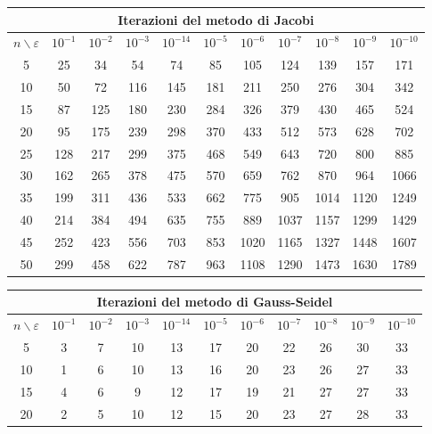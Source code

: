 \begin{sol}
        \footnotesize
        \begin{center}\begin{tabular}{|c||c|c|c|c|c|c|c|c|c|c|}
        \multicolumn{11}{c}{Iterazioni del metodo di Jacobi}\\
        \hline
        $n \backslash \varepsilon $ & $10^{-1}$& $10^{-2}$& $10^{-3}$& $10^{-14}$& $10^{-5}$& $10^{-6}$& $10^{-7}$& $10^{-8}$& $10^{-9}$& $10^{-10}$\\\hline
        5& 25 & 34 & 54 & 74 & 85 & 105 & 124 & 139 & 157 & 171 \\\hline
        10& 50 & 72 & 116 & 145 & 181 & 211 & 250 & 276 & 304 & 342 \\\hline
        15& 87 & 125 & 180 & 230 & 284 & 326 & 379 & 430 & 465 & 524 \\ \hline
        20& 95 & 175 & 239 & 298 & 370 & 433 & 512 & 573 & 628 & 702 \\\hline
        25& 128 & 217 & 299 & 375 & 468 & 549 & 643 & 720 & 800 & 885 \\ \hline
        30& 162 & 265 & 378 & 475 & 570 & 659 & 762 & 870 & 964 & 1066 \\ \hline
        35& 199 & 311 & 436 & 533 & 662 & 775 & 905 & 1014 & 1120 & 1249 \\ \hline
        40& 214 & 384 & 494 & 635 & 755 & 889 & 1037 & 1157 & 1299 & 1429 \\ \hline
        45& 252 & 423 & 556 & 703 & 853 & 1020 & 1165 & 1327 & 1448 & 1607 \\ \hline
        50& 299 & 458 & 622 & 787 & 963 & 1108 & 1290 & 1473 & 1630 & 1789 \\\hline
        \end{tabular}\end{center}
        \begin{center}\begin{tabular}{|c||c|c|c|c|c|c|c|c|c|c|}
        \multicolumn{11}{c}{Iterazioni del metodo di Gauss-Seidel}\\
        \hline
        $n \backslash \varepsilon $ & $10^{-1}$& $10^{-2}$& $10^{-3}$& $10^{-14}$& $10^{-5}$& $10^{-6}$& $10^{-7}$& $10^{-8}$& $10^{-9}$& $10^{-10}$\\\hline
        5 & 3 & 7 & 10 & 13 & 17 & 20 & 22 & 26 & 30 & 33 \\\hline
        10 & 1 & 6 & 10 & 13 & 16 & 20 & 23 & 26 & 27 & 33 \\\hline
        15 & 4 & 6 & 9 & 12 & 17 & 19 & 21 & 27 & 27 & 33 \\ \hline
        20 & 2 & 5 & 10 & 12 & 15 & 20 & 23 & 27 & 28 & 33 \\ \hline

\end{tabular}
\end{center}
\end{sol}
